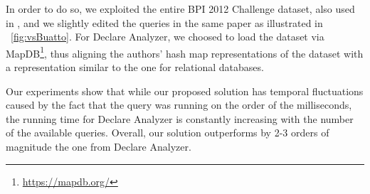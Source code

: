 
In order to do so, we exploited the entire BPI 2012 Challenge dataset, also used in \cite{BurattinMS16}, and we slightly edited the queries in the same paper as illustrated in \figurename~\ref{fig:vsBuatto}. For Declare Analyzer, we choosed to load the dataset via MapDB\footnote{\url{https://mapdb.org/}}, thus aligning the authors' hash map representations of the dataset with a representation similar to the one for relational databases. 

Our experiments show that while our proposed solution has temporal fluctuations caused by the fact that the query was running on the order of the milliseconds, the running time for Declare Analyzer is constantly increasing with the number of the available queries. Overall, our solution outperforms by 2-3 orders of magnitude the one from Declare Analyzer.


%
%
%
